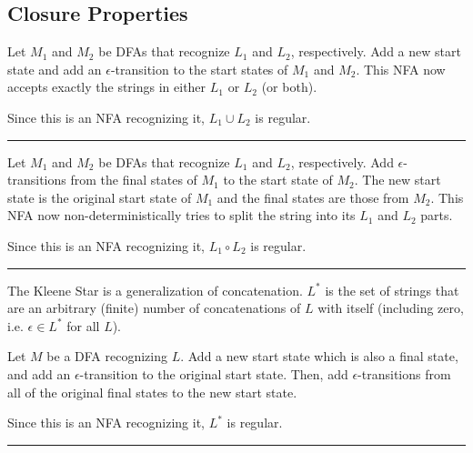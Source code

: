 \documentclass[twoside]{article}
\newenvironment{proof}{{\bf Proof:}}{\hfill\rule{2mm}{2mm}}
\begin{document}
\subsection*{Closure Properties}


\begin{proof}
	
	Let $M_1$ and $M_2$ be DFAs that recognize $L_1$ and $L_2$, respectively.  Add a new start state and add an $\epsilon$-transition to the start states of $M_1$ and $M_2$.  This NFA now accepts exactly the strings in either $L_1$ or $L_2$ (or both).
	
	Since this is an NFA recognizing it, 	$L_1\cup L_2$ is regular.
	
	
\end{proof}


\begin{proof}
	
		Let $M_1$ and $M_2$ be DFAs that recognize $L_1$ and $L_2$, respectively.  Add $\epsilon$-transitions from the final states of $M_1$ to the start state of $M_2$.  The new start state is the original start state of $M_1$ and the final states are those from $M_2$.  This NFA now non-deterministically tries to split the string into its $L_1$ and $L_2$ parts.
		
	Since this is an NFA recognizing it, 	$L_1\circ L_2$ is regular.
	
	
\end{proof}


The Kleene Star is a generalization of concatenation.  $L^*$ is the set of strings that are an arbitrary (finite) number of concatenations of $L$ with itself (including zero, i.e. $\epsilon\in L^*$ for all $L$).

\begin{proof}
	
	Let $M$ be a DFA recognizing $L$.  Add a new start state which is also a final state, and add an $\epsilon$-transition to the original start state.  Then, add $\epsilon$-transitions from all of the original final states to the new start state.
	
		Since this is an NFA recognizing it, 	$L^*$ is regular.
	
\end{proof}
\end{document}
